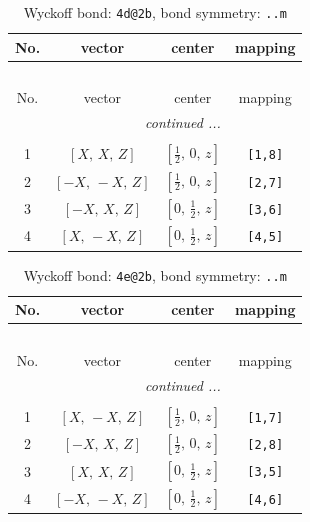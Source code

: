 \documentclass[fleqn,8pt]{jsarticle}
\begin{document}
\begin{longtable}{cccc}
\caption{Wyckoff bond: {\tt 4d@2b}, bond symmetry: {\tt ..m}}
 \\
 \hline \hline
No. & vector & center & mapping \\ \hline \endfirsthead

\multicolumn{3}{l}{\tablename\ \thetable{}} \\
 \hline \hline
No. & vector & center & mapping \\ \hline \endhead

 \hline \hline
\multicolumn{3}{r}{\footnotesize\it continued ...} \\ \endfoot

 \hline \hline
\multicolumn{3}{r}{} \\ \endlastfoot

1 & $\left[ X,\, X,\, Z \right]$ & $\left[ \frac{1}{2},\, 0,\, z \right]$ & {\tt [1,8]} \\ \hline
2 & $\left[ - X,\, - X,\, Z \right]$ & $\left[ \frac{1}{2},\, 0,\, z \right]$ & {\tt [2,7]} \\ \hline
3 & $\left[ - X,\, X,\, Z \right]$ & $\left[ 0,\, \frac{1}{2},\, z \right]$ & {\tt [3,6]} \\ \hline
4 & $\left[ X,\, - X,\, Z \right]$ & $\left[ 0,\, \frac{1}{2},\, z \right]$ & {\tt [4,5]} \\
\end{longtable}
\renewcommand{\arraystretch}{1.2}
\begin{longtable}{cccc}
\caption{Wyckoff bond: {\tt 4e@2b}, bond symmetry: {\tt ..m}}
 \\
 \hline \hline
No. & vector & center & mapping \\ \hline \endfirsthead

\multicolumn{3}{l}{\tablename\ \thetable{}} \\
 \hline \hline
No. & vector & center & mapping \\ \hline \endhead

 \hline \hline
\multicolumn{3}{r}{\footnotesize\it continued ...} \\ \endfoot

 \hline \hline
\multicolumn{3}{r}{} \\ \endlastfoot

1 & $\left[ X,\, - X,\, Z \right]$ & $\left[ \frac{1}{2},\, 0,\, z \right]$ & {\tt [1,7]} \\ \hline
2 & $\left[ - X,\, X,\, Z \right]$ & $\left[ \frac{1}{2},\, 0,\, z \right]$ & {\tt [2,8]} \\ \hline
3 & $\left[ X,\, X,\, Z \right]$ & $\left[ 0,\, \frac{1}{2},\, z \right]$ & {\tt [3,5]} \\ \hline
4 & $\left[ - X,\, - X,\, Z \right]$ & $\left[ 0,\, \frac{1}{2},\, z \right]$ & {\tt [4,6]} \\
\end{longtable}
\end{document}
